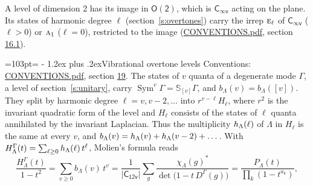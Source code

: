 \documentclass[10pt,a4paper]{article}
\makeatletter
\renewcommand\section{\@startsection{section}{1}{\z@}{-3ex plus -1ex minus -.2ex}%
  {1.2ex plus .2ex}{\normalfont\large\sffamily\bfseries\color{parttitle}}}
\newcommand{\needspace}[1]{\par\penalty-100\begingroup\dimen0=#1\relax\dimen2=\pagegoal
  \advance\dimen2-\pagetotal\ifdim\dimen0>\dimen2\relax\ifdim\dimen2>0pt\vfil\break\fi\fi
  \endgroup}
\numberwithin{equation}{section}
\newcommand{\grp}[1]{\mathsf{#1}}
\newcommand{\irr}[1]{\text{\normalfont\scshape #1}}
\newcommand{\repD}[1]{D^{#1}}
\newcommand{\irchar}[1]{\chi_{#1}}
\newcommand{\conj}[1]{{#1}^{*}}
\newcommand{\schur}[1]{\mathbb{S}_{#1}}
\newcommand{\shape}[1]{[#1]}
\makeatother
\begin{document}
A level of dimension 2 has its image in $\grp{O(2)}$, which is \href{Cinfv.pdf}{$\grp{C_{\infty v}}$} acting on the plane. \label{n:index.harmonic.degree}Its states of harmonic degree $\ell$ (section~\ref{s:overtones}) carry the irrep $\irr{e}_{\ell}$ of \href{Cinfv.pdf}{$\grp{C_{\infty v}}$} ($\ell > 0$) or $\irr{a}_{1}$ ($\ell = 0$), restricted to the image (\href{../../CONVENTIONS.pdf}{CONVENTIONS.pdf}, section \href{../../CONVENTIONS.pdf\#conv.16.1}{16.1}).
\needspace{103pt}
\section{Vibrational overtone levels}\label{s:overtones}
Conventions: \href{../../CONVENTIONS.pdf}{CONVENTIONS.pdf}, section \href{../../CONVENTIONS.pdf\#conv.19}{19}.
\leavevmode\label{n:index.quanta}\label{n:operator.symmetric.power}The states of $v$ quanta of a degenerate mode $\Gamma$, a level of section~\ref{s:unitary}, carry $\operatorname{Sym}^{v}\Gamma = \schur{\shape{v}}\Gamma$, and $b_\Lambda(v) = b_\Lambda(\shape{v})$. \label{n:local.quadratic.form}\label{n:set.harmonic}They split by harmonic degree $\ell = v, v - 2, \dots$ into $r^{v-\ell}H_\ell$, where $r^2$ is the invariant quadratic form of the level and $H_\ell$ consists of the states of $\ell$ quanta annihilated by the invariant Laplacian. \label{n:function.multiplicity.harmonic}Thus the multiplicity $\mathnormal{h}_\Lambda(\ell)$ of $\Lambda$ in $H_\ell$ is the same at every $v$, and $b_\Lambda(v) = \mathnormal{h}_\Lambda(v) + \mathnormal{h}_\Lambda(v - 2) + \dots$. \label{n:function.generating.level}With $H^{\Gamma}_\Lambda(t) = \sum_{\ell\ge0} \mathnormal{h}_\Lambda(\ell)\,t^{\ell}$, Molien's formula reads
\begin{equation}\label{e:molien}\frac{H^{\Gamma}_\Lambda(t)}{1 - t^2} = \sum_{v\ge0} b_\Lambda(v)\,t^v = \frac{1}{|\grp{C_{12v}}|}\sum_{g}\frac{\conj{\irchar{\Lambda}(g)}}{\det\bigl(1 - t\,\repD{\Gamma}(g)\bigr)} = \frac{P_\Lambda(t)}{\prod_k (1-t^{a_k})},\end{equation}
\end{document}
